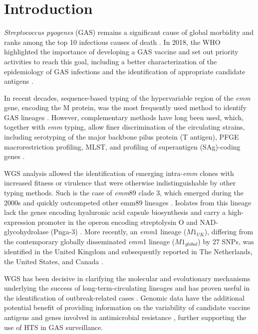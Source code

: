 \section{Introduction}

\textit{Streptococcus pyogenes} (\ac{GAS}) remains a signiﬁcant cause of global morbidity and ranks among the top 10 infectious causes of death \cite{carapetis_global_2005}. In 2018, the \ac{WHO} highlighted the importance of developing a \ac{GAS} vaccine and set out priority activities to reach this goal, including a better characterization of the epidemiology of \ac{GAS} infections and the identiﬁcation of appropriate candidate antigens \cite{vekemans_path_2019}.

In recent decades, sequence-based typing of the hypervariable region of the \textit{emm} gene, encoding the M protein, was the most frequently used method to identify \ac{GAS} lineages \cite{beall_sequencing_1996}. However, complementary methods have long been used, which, together with \textit{emm} typing, allow ﬁner discrimination of the circulating strains, including serotyping of the major backbone pilus protein (T antigen), \ac{PFGE} macrorestriction proﬁling, \ac{MLST}, and proﬁling of superantigen (SAg)-coding genes \cite{carrico_illustration_2006, friaes_superantigen_2013, enright_multilocus_2001}.

\ac{WGS} analysis allowed the identiﬁcation of emerging intra-\textit{emm} clones with increased ﬁtness or virulence that were otherwise indistinguishable by other typing methods. Such is the case of \textit{emm}89 clade 3, which emerged during the 2000s and quickly outcompeted other emm89 lineages \cite{friaes_emergence_2015, turner_emergence_2015, zhu_molecular_2015}. Isolates from this lineage lack the genes encoding hyaluronic acid capsule biosynthesis and carry a high-expression promoter in the operon encoding streptolysin O and NAD-glycohydrolase (Pnga-3) \cite{turner_emergence_2015, zhu_trading_2015}. More recently, an \textit{emm}1 lineage ($M1_{UK}$), differing from the contemporary globally disseminated \textit{emm}1 lineage ($M1_{global}$) by 27 \ac{SNPs}, was identiﬁed in the United Kingdom \cite{lynskey_emergence_2019-1} and subsequently reported in The Netherlands, the United States, and Canada \cite{rumke_dominance_2020, li_m1uk_2020, demczuk_identification_2019}.

\ac{WGS} has been decisive in clarifying the molecular and evolutionary mechanisms underlying the success of long-term-circulating lineages \cite{nasser_evolutionary_2014, beres_molecular_2010} and has proven useful in the identiﬁcation of outbreak-related cases \cite{turner_community_2017, coelho_genomic_2019}. Genomic data have the additional potential beneﬁt of providing information on the variability of candidate vaccine antigens and genes involved in antimicrobial resistance \cite{davies_atlas_2019, beres_integrative_2022}, further supporting the use of \ac{HTS} in \ac{GAS} surveillance.

